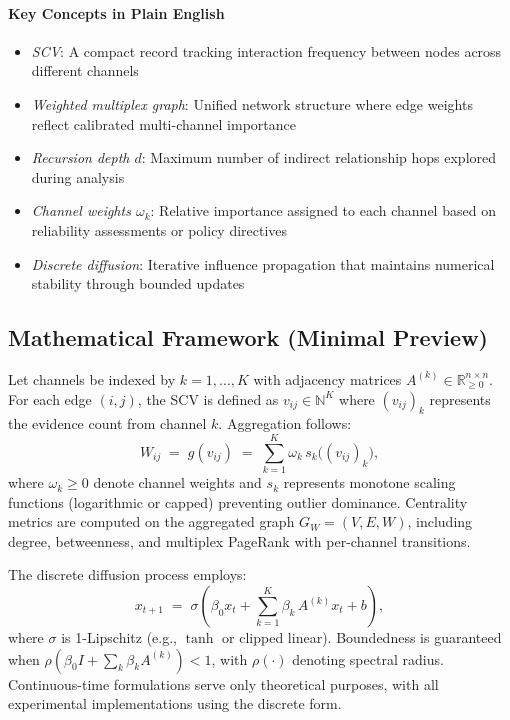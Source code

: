 \documentclass[12pt]{article}
\theoremstyle{plain}
\begin{document}
\paragraph*{Key Concepts in Plain English}
\begin{itemize}
  \item \emph{SCV}: A compact record tracking interaction frequency between nodes across different channels
  \item \emph{Weighted multiplex graph}: Unified network structure where edge weights reflect calibrated multi-channel importance
  \item \emph{Recursion depth $d$}: Maximum number of indirect relationship hops explored during analysis
  \item \emph{Channel weights $\omega_k$}: Relative importance assigned to each channel based on reliability assessments or policy directives
  \item \emph{Discrete diffusion}: Iterative influence propagation that maintains numerical stability through bounded updates
\end{itemize}

\subsection*{Mathematical Framework (Minimal Preview)}
Let channels be indexed by $k=1,\dots,K$ with adjacency matrices $A^{(k)}\in\mathbb{R}_{\ge 0}^{n\times n}$. For each edge $(i,j)$, the SCV is defined as $v_{ij}\in\mathbb{N}^K$ where $(v_{ij})_k$ represents the evidence count from channel $k$. Aggregation follows:
\begin{equation}
  W_{ij} \;=\; g(v_{ij}) \;=\; \sum_{k=1}^{K} \omega_k\, s_k\!\big((v_{ij})_k\big),
\end{equation}
where $\omega_k\ge 0$ denote channel weights and $s_k$ represents monotone scaling functions (logarithmic or capped) preventing outlier dominance. Centrality metrics are computed on the aggregated graph $G_W=(V,E,W)$, including degree, betweenness, and multiplex PageRank with per-channel transitions.

The discrete diffusion process employs:
\begin{equation}
  x_{t+1} \;=\; \sigma\!\left(\beta_0 x_t + \sum_{k=1}^{K} \beta_k\,A^{(k)} x_t + b\right),
\end{equation}
where $\sigma$ is 1-Lipschitz (e.g., $\tanh$ or clipped linear). Boundedness is guaranteed when $\rho\!\left(\beta_0 I+\sum_{k} \beta_k A^{(k)}\right)<1$, with $\rho(\cdot)$ denoting spectral radius. Continuous-time formulations serve only theoretical purposes, with all experimental implementations using the discrete form.
\end{document}
